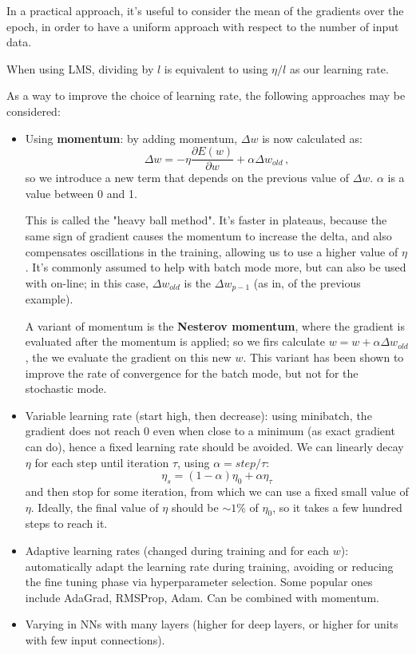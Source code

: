 In a practical approach, it's useful to consider the mean of the gradients over the epoch, in order to have a uniform approach with respect to the number of input data.

When using LMS, dividing by $l$ is equivalent to using $\eta/l$ as our learning rate.

As a way to improve the choice of learning rate, the following approaches may be considered:

\begin{itemize}
    \item Using \textbf{momentum}: by adding momentum, $\Delta w$ is now calculated as:
    \begin{equation*}
        \Delta w = - \eta \dfrac{\partial E(w)}{\partial w} + \alpha \Delta w_{old} \, ,
    \end{equation*}
    so we introduce a new term that depends on the previous value of $\Delta w$. $\alpha$ is a value between 0 and 1.

    This is called the "heavy ball method". It's faster in plateaus, because the same sign of gradient causes the momentum to increase the delta, and also compensates oscillations in the training, allowing us to use a higher value of $\eta$. It's commonly assumed to help with batch mode more, but can also be used with on-line; in this case, $\Delta w_{old}$ is the $\Delta w_{p-1}$ (as in, of the previous example).

    A variant of momentum is the \textbf{Nesterov momentum}, where the gradient is evaluated after the momentum is applied; so we firs calculate $w = w + \alpha \Delta w_{old}$, the we evaluate the gradient on this new $w$. This variant has been shown to improve the rate of convergence for the batch mode, but not for the stochastic mode.
    
    \item Variable learning rate (start high, then decrease):
    using minibatch, the gradient does not reach 0 even when close to a minimum (as exact gradient can do), hence a fixed learning rate should be avoided. We can linearly decay $\eta$ for each step until iteration $\tau$, using $\alpha = step / \tau$:
    \begin{equation*}
        \eta_s = (1-\alpha)\eta_0 + \alpha \eta_{\tau} 
    \end{equation*}
    and then stop for some iteration, from which we can use a fixed small value of $\eta$. Ideally, the final value of $\eta$ should be $\sim 1\%$ of $\eta_0$, so it takes a few hundred steps to reach it.
    
    \item Adaptive learning rates (changed during training and for each $w$): automatically adapt the learning rate during training, avoiding or reducing the fine tuning phase via hyperparameter selection. Some popular ones include AdaGrad, RMSProp, Adam. Can be combined with momentum.
    
    \item Varying in NNs with many layers (higher for deep layers, or higher for units with few input connections).
\end{itemize}

